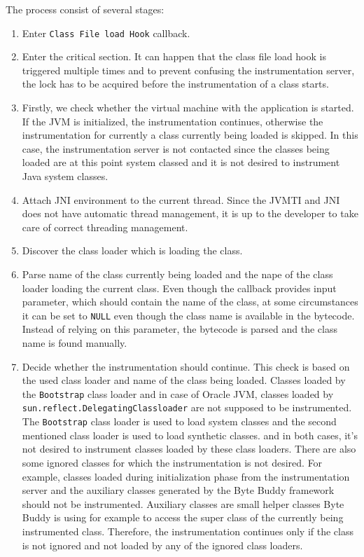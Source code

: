 The process consist of several stages:
\begin{enumerate}
	\item Enter \texttt{Class File load Hook} callback.
	\item Enter the critical section. It can happen that the class file load hook is triggered multiple times and to prevent confusing the instrumentation server, the lock has to be acquired before the instrumentation of a class starts.
	\item Firstly, we check whether the virtual machine with the application is \linebreak started. If the JVM is initialized, the instrumentation continues, otherwise the instrumentation for currently a class currently being loaded is skipped. In this case, the instrumentation server is not contacted since the classes being loaded are at this point system classed and it is not desired to instrument Java system classes.
	\item Attach JNI environment to the current thread. Since the JVMTI and JNI does not have automatic thread management, it is up to the developer to take care of correct threading management.
	\item Discover the class loader which is loading the class.
	\item Parse name of the class currently being loaded and the nape of the class loader loading the current class. Even though the callback provides input parameter, which should contain the name of the class, at some circumstances it can be set to \texttt{NULL} even though the class name is available in the bytecode. Instead of relying on this parameter, the bytecode is parsed and the class name is found manually.
	\item Decide whether the instrumentation should continue. This check is based on the used class loader and name of the class being loaded. Classes loaded by the \texttt{Bootstrap} class loader and in case of Oracle JVM, classes loaded by \texttt{sun.reflect.DelegatingClassloader} are not supposed to be instrumented. 
	The \texttt{Bootstrap} class loader is used to load system classes and the second mentioned class loader is used to load synthetic classes. and in both cases, it's not desired to instrument classes loaded by these class loaders.
	There are also some ignored classes for which the instrumentation is not desired. For example, classes loaded during initialization phase from the instrumentation server and the auxiliary classes generated by the Byte Buddy framework should not be instrumented. Auxiliary classes are small helper classes Byte Buddy is using for example to access the super class of the currently being instrumented class. Therefore, the instrumentation continues only if the class is not ignored and not loaded by any of the ignored class loaders.
	

\end{enumerate}
